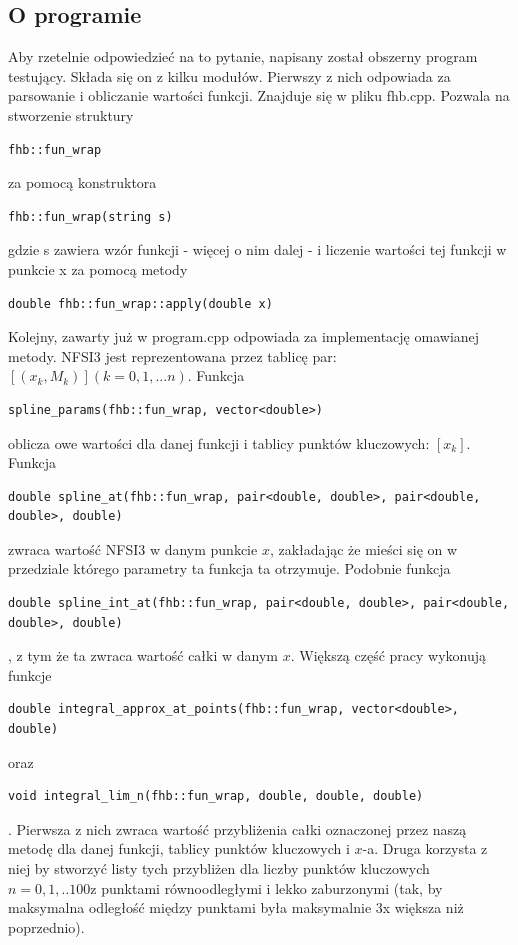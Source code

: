 \documentclass[11pt,wide]{mwart}
\begin{document}
\subsection{O programie}
Aby rzetelnie odpowiedzieć na to pytanie, napisany został obszerny program testujący. Składa się on z kilku modułów.
Pierwszy z nich odpowiada za parsowanie i obliczanie wartości funkcji. 
Znajduje się w pliku fhb.cpp.
Pozwala na stworzenie struktury \begin{verbatim}fhb::fun_wrap\end{verbatim} za pomocą konstruktora \begin{verbatim}fhb::fun_wrap(string s)\end{verbatim} gdzie s zawiera wzór funkcji - więcej o nim dalej - i liczenie wartości tej funkcji w punkcie x za pomocą metody \begin{verbatim}double fhb::fun_wrap::apply(double x)\end{verbatim}
Kolejny, zawarty już w program.cpp odpowiada za implementację omawianej metody.
NFSI3 jest reprezentowana przez tablicę par: $[(x_k,M_k)] (k=0,1,...n)$. Funkcja 
\begin{verbatim}
spline_params(fhb::fun_wrap, vector<double>)
\end{verbatim} 
oblicza owe wartości dla danej funkcji i tablicy punktów kluczowych: $[x_k]$. Funkcja 
\begin{verbatim}
double spline_at(fhb::fun_wrap, pair<double, double>, pair<double, double>, double)
\end{verbatim} 
zwraca wartość NFSI3 w danym punkcie $x$, zakładając że mieści się on w przedziale którego parametry ta funkcja ta otrzymuje. Podobnie funkcja 
\begin{verbatim}
double spline_int_at(fhb::fun_wrap, pair<double, double>, pair<double, double>, double)
\end{verbatim}
, z tym że ta zwraca wartość całki w danym $x$. Większą część pracy wykonują funkcje 
\begin{verbatim}
double integral_approx_at_points(fhb::fun_wrap, vector<double>, double)
\end{verbatim} 
oraz 
\begin{verbatim}
void integral_lim_n(fhb::fun_wrap, double, double, double)
\end{verbatim}
. Pierwsza z nich zwraca wartość przybliżenia całki oznaczonej przez naszą metodę dla danej funkcji, tablicy punktów kluczowych i $x$-a. Druga korzysta z niej by stworzyć listy tych przybliżen dla liczby punktów kluczowych $n=0,1,..100$z punktami równoodległymi i lekko zaburzonymi (tak, by maksymalna odległość między punktami była maksymalnie 3x większa niż poprzednio).
\end{document}
